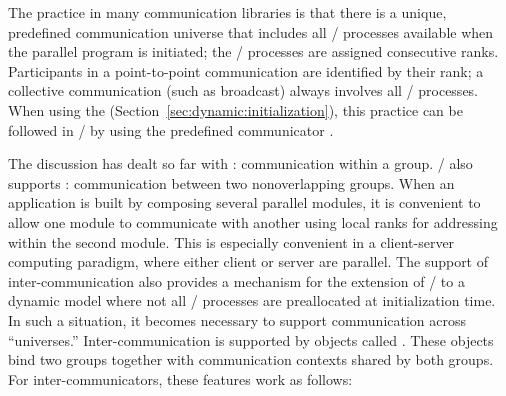 \begin{users}
The practice in many communication libraries is that there is
a unique, predefined communication universe that includes all
\MPI/ processes available when the parallel program is initiated; the \MPI/ processes are
assigned consecutive ranks. Participants in a point-to-point
communication are identified by their rank; a collective communication
(such as broadcast) always involves all \MPI/ processes.
When using the \wpm{} (Section~\ref{sec:dynamic:initialization}), this practice can be
followed in \MPI/ by using the predefined communicator
.
\end{users}

The discussion has dealt so far with :
communication
within a group. \MPI/ also supports : 
communication
between two nonoverlapping groups. When an application is built by composing
several parallel modules, it is convenient to allow one module to communicate
with another using local ranks for addressing within the second module. This
is especially convenient in a client-server computing paradigm, where either
client or server are parallel. The support of inter-communication
also provides a mechanism for the extension of \MPI/ to a dynamic model where
not all \MPI/ processes are preallocated at initialization time. In such a
situation, it becomes necessary to support communication across ``universes.''
Inter-communication is supported by objects called
.
These objects bind two groups together with communication contexts shared by
both groups.
For inter-communicators, these features work as follows:
